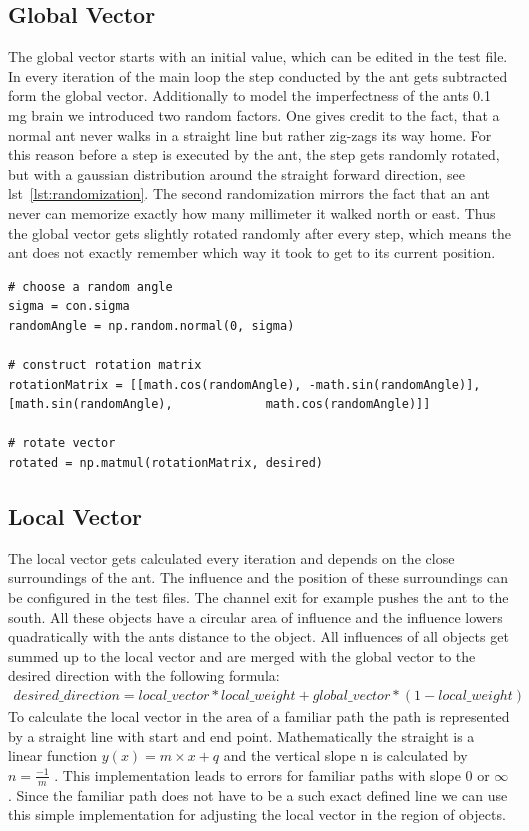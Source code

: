 \documentclass[11pt]{article}
\begin{document}
	\subsection{Global Vector}
		The global vector starts with an initial value, which can be edited in the test file. In every iteration of the main loop the step conducted by the ant gets subtracted form the global vector. Additionally to model the imperfectness of the ants 0.1 mg brain we introduced two random factors. One gives credit to the fact, that a normal ant never walks in a straight line but rather zig-zags its way home. For this reason before a step is executed by the ant, the step gets randomly rotated, but with a gaussian distribution around the straight forward direction, see lst~\vref{lst:randomization}. The second randomization mirrors the fact that an ant never can memorize exactly how many millimeter it walked north or east. Thus the global vector gets slightly rotated randomly after every step, which means the ant does not exactly remember which way it took to get to its current position.
		
		
		
\begin{lstlisting}[caption={Randomization of desired step},label=lst:randomization]
# choose a random angle
sigma = con.sigma
randomAngle = np.random.normal(0, sigma)

# construct rotation matrix
rotationMatrix = [[math.cos(randomAngle), -math.sin(randomAngle)], [math.sin(randomAngle), 			   math.cos(randomAngle)]]

# rotate vector
rotated = np.matmul(rotationMatrix, desired)
\end{lstlisting}

	\subsection{Local Vector}
		The local vector gets calculated every iteration and depends on the close surroundings of the ant. The influence and the position of these surroundings can be configured in the test files. The channel exit for example pushes the ant to the south. All these objects have a circular area of influence and the influence lowers quadratically with the ants distance to the object. All influences of all objects get summed up to the local vector and are merged with the global vector to the desired direction with the following formula:
		\begin{align*}
			desired\_direction = local\_vector * local\_weight + global\_vector * (1-local\_weight)
		\end{align*}
To calculate the local vector in the area of a familiar path the path is represented by a straight line with start and end point. Mathematically the straight is a linear function \( y(x)= m\times x + q \) and the vertical slope n is calculated by \( n = \frac {-1} {m}\) . This implementation leads to errors for familiar paths with slope 0 or \(\infty\). Since the familiar path does not have to be a such exact defined line we can use this simple implementation for adjusting the local vector in the region of objects.
\end{document}
